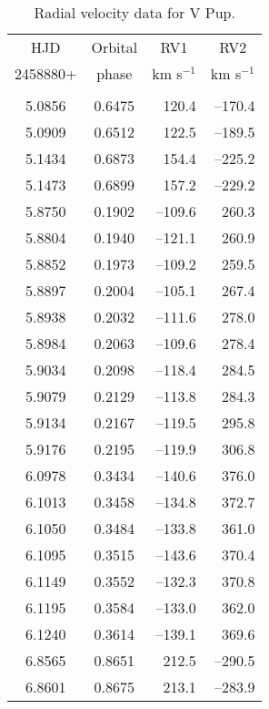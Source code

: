 \documentclass[useAMS,usenatbib]{mnras}                                                                           \usepackage[pdftex]{graphicx}
\begin{document}
\begin{table}
\begin{center}
\caption{Radial velocity data for V Pup.
\label{tbl-5}} 
\begin{footnotesize}
   \begin{tabular}{ccrr} 
\multicolumn{1}{c}{HJD}  & \multicolumn{1}{c}{Orbital} & 
\multicolumn{1}{c}{RV1} & \multicolumn{1}{c}{RV2} \\ %
\multicolumn{1}{c}{2458880+}  & \multicolumn{1}{c}{phase } &
\multicolumn{1}{c}{km s$^{-1}$} & \multicolumn{1}{c}{km s$^{-1}$}\\ 
\hline \\
5.0856&	0.6475&	120.4&	--170.4\\	   
5.0909&	0.6512&	122.5&	--189.5\\	   
5.1434&	0.6873&	154.4&	--225.2\\	   
5.1473&	0.6899&	157.2&	--229.2\\	   
5.8750&	0.1902&	--109.6&	260.3\\	   
5.8804&	0.1940&	--121.1&	260.9\\	   
5.8852&	0.1973&	--109.2&	259.5\\ 	   
5.8897&	0.2004&	--105.1&	267.4\\ 	   
5.8938&	0.2032&	--111.6&	278.0\\ 	   
5.8984&	0.2063&	--109.6&	278.4\\ 	   
5.9034&	0.2098&	--118.4&	284.5\\ 	   
5.9079&	0.2129&	--113.8&	284.3\\ 	   
5.9134&	0.2167&	--119.5&	295.8\\ 	   
5.9176&	0.2195&	--119.9&	306.8\\ 	   
6.0978&	0.3434&	--140.6&	376.0\\ 	   
6.1013&	0.3458&	--134.8&	372.7\\ 	   
6.1050&	0.3484&	--133.8&	361.0\\ 	   
6.1095&	0.3515&	--143.6&	370.4\\ 	   
6.1149&	0.3552&	--132.3&	370.8\\ 	   
6.1195&	0.3584&	--133.0&	362.0\\ 	   
6.1240&	0.3614&	--139.1&	369.6\\ 	   	   
6.8565&	0.8651&	212.5&	--290.5\\ 	   
6.8601&	0.8675&	213.1&	--283.9\\ 	   

\end{tabular}
\end{footnotesize}
\end{center}
\end{table}
\end{document}
